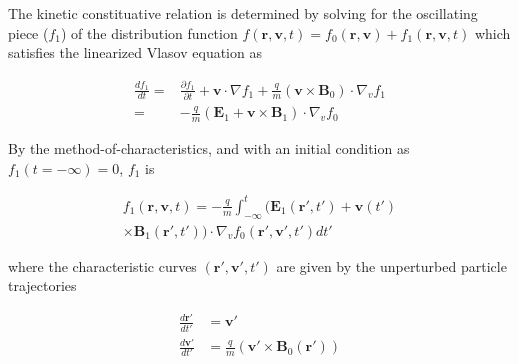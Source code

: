 \documentclass[final,5p,times,twocolumn]{elsarticle}
\newcounter{bla}
\renewcommand{\vec}[1]{\mathbf{#1}}
\begin{document}
The kinetic constituative relation is determined by solving for the oscillating piece ($f_{\mathrm{1}}$) of the distribution function $f\left(\vec{r},\vec{v},t\right)=f_{\mathrm{0}}\left(\vec{r},\vec{v}\right)+f_{\mathrm{1}}\left(\vec{r},\vec{v},t\right)$ which satisfies the linearized Vlasov equation as 
%
\begin{linenomath}
\begin{equation}
\begin{split}
\label{eq:lin_vlasov}
\frac{df_1}{dt}=&\frac{\partial f_1}{\partial t}+\vec{v}\cdot\nabla f_{\mathrm{1}}+\frac{q}{m}\left(\vec{v}\times\vec{B}_{\mathrm{0}}\right)\cdot\nabla_v f_1\\=&-\frac{q}{m}\left(\vec{E}_1+\vec{v}\times\vec{B}_1\right)\cdot\nabla_v f_0
\end{split}
\end{equation}
\end{linenomath}
%
By the method-of-characteristics, and with an initial condition as $f_{\mathrm{1}}\left(t=-\mathrm{\infty}\right)=0$, $f_{\mathrm{1}}$ is 
%
\begin{linenomath}
\begin{equation}
\begin{split}
\label{eq:f1}
f_{\mathrm{1}}\left(\vec{r},\vec{v},t\right)=-\frac{q}{m}\int_{-\mathrm{\infty}}^{t}
\Big(\vec{E}_{\mathrm{1}}\left(\vec{r}',t'\right)+\vec{v}\left(t'\right)\\ \times\vec{B}_1\left(\vec{r}',t'\right) 
\hspace{0cm}\Big) \cdot\nabla_v f_{\mathrm{0}} \left(\vec{r}',\vec{v}',t'\right)dt'
\end{split}
\end{equation}
\end{linenomath}
%
where the characteristic curves $\left(\vec{r}',\vec{v}',t'\right)$ are given by the unperturbed particle trajectories
%
\begin{linenomath}
\begin{equation}
\begin{split}
\label{eq:trajectories}
\frac{d\vec{r}'}{dt'}&=\vec{v}'\\
\frac{d\vec{v}'}{dt'}&=\frac{q}{m}\left(\vec{v}'\times\vec{B}_{\mathrm{0}}\left(\vec{r}'\right)\right)
\end{split}
\end{equation}
\end{linenomath}
\end{document}
